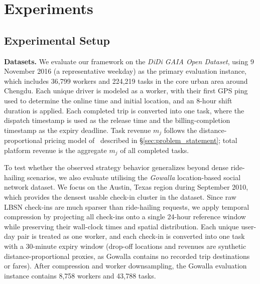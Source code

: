 \section{Experiments}
\label{sec:experiments}


\subsection{Experimental Setup}
\label{sec:setup}

\textbf{Datasets.}
\label{sec:datasets}
We evaluate our framework on the \textit{DiDi GAIA Open Dataset}, using 9 November 2016 (a representative weekday) as the primary evaluation instance, which includes 36,799 workers and 224,219 tasks in the core urban area around Chengdu. Each unique driver is modeled as a worker, with their first GPS ping used to determine the online time and initial location, and an 8-hour shift duration is applied. Each completed trip is converted into one task, where the dispatch timestamp is used as the release time and the billing-completion timestamp as the expiry deadline. Task revenue $m_j$ follows the distance-proportional pricing model of~\cite{CR-04} described in §\ref{sec:problem_statement}; total platform revenue is the aggregate $m_j$ of all completed tasks.

To test whether the observed strategy behavior generalizes beyond dense ride-hailing scenarios, we also evaluate utilising the \textit{Gowalla} location-based social network dataset. We focus on the Austin, Texas region during September 2010, which provides the densest usable check-in cluster in the dataset. Since raw LBSN check-ins are much sparser than ride-hailing requests, we apply temporal compression by projecting all check-ins onto a single 24-hour reference window while preserving their wall-clock times and spatial distribution. Each unique user-day pair is treated as one worker, and each check-in is converted into one task with a 30-minute expiry window (drop-off locations and revenues are synthetic distance-proportional proxies, as Gowalla contains no recorded trip destinations or fares). After compression and worker downsampling, the Gowalla evaluation instance contains 8,758 workers and 43,788 tasks.

